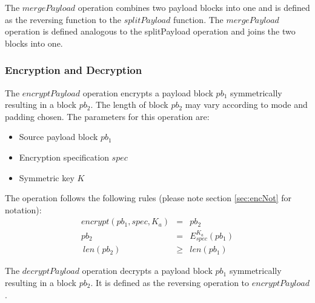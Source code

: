 \documentclass[acmsmall, screen]{acmart}
\begin{document}
The $mergePayload$ operation combines two payload blocks into one and is defined as the reversing function to the $splitPayload$ function. 
%
%
%
The $mergePayload$ operation is defined analogous to the splitPayload operation and joins the two blocks into one.
%

\subsubsection{Encryption and Decryption}
The $encryptPayload$ operation encrypts a payload block $pb_1$ symmetrically resulting in a block $pb_2$. The length of block $pb_2$ may vary according to mode and padding chosen. The parameters for this operation are:
\begin{itemize}
	\item Source payload block $pb_1$
	\item Encryption specification $spec$
	\item Symmetric key $K$
\end{itemize}

The operation follows the following rules (please note section \ref{sec:encNot} for notation):
\begin{eqnarray}
encrypt(pb_1, spec, K_a) & = & pb_2 \\
pb_2 & = & E_{spec}^{K_a}\left( pb_1 \right)\\\
len(pb_2) & \geq & len(pb_1)
\end{eqnarray}


The $decryptPayload$ operation decrypts a payload block $pb_1$ symmetrically resulting in a block $pb_2$. It is defined as the reversing operation to $encryptPayload$. 
\end{document}
